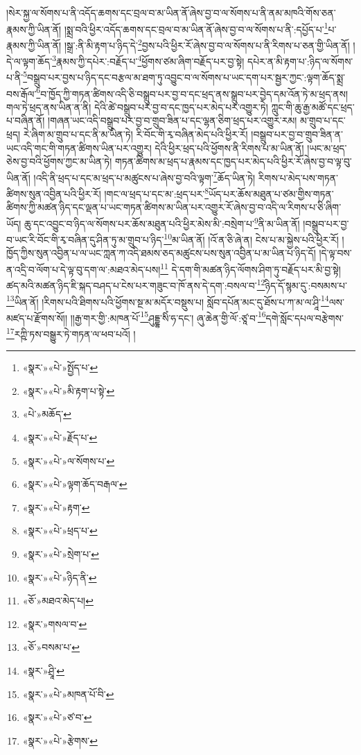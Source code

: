 །སེར་སྐྱ་ལ་སོགས་པ་ནི་འདོད་ཆགས་དང་བྲལ་བ་མ་ཡིན་ནོ་ཞེས་བྱ་བ་ལ་སོགས་པ་ནི་ནམ་མཁའི་གོས་ཅན་རྣམས་ཀྱི་ཡིན་ནོ། །སྨྲ་བའི་ཕྱིར་འདོད་ཆགས་དང་བྲལ་བ་མ་ཡིན་ནོ་ཞེས་བྱ་བ་ལ་སོགས་པ་ནི་:དཔྱོད་པ་\footnote{«སྣར་»«པེ་»སྤྱོད་པ་}པ་རྣམས་ཀྱི་ཡིན་ནོ། །སྒྲ་:ནི་མི་རྟག་པ་ཉིད་དེ་\footnote{«སྣར་»«པེ་»མི་རྟག་པ་སྟེ་}བྱས་པའི་ཕྱིར་རོ་ཞེས་བྱ་བ་ལ་སོགས་པ་ནི་རིགས་པ་ཅན་གྱི་ཡིན་ནོ། །དེ་ལ་ལྟག་ཆོད་\footnote{«པེ་»མཆོད་}རྣམས་ཀྱི་དཔེར་:བརྗོད་པ་\footnote{«སྣར་»«པེ་»རྗོད་པ་}ཕྱོགས་ཙམ་ཞིག་བརྗོད་པར་བྱ་སྟེ། དཔེར་ན་མི་རྟག་པ་:ཉིད་ལ་སོགས་པ་ནི་\footnote{«སྣར་»«པེ་»ལ་སོགས་པ་}བསྒྲུབ་པར་བྱས་པ་ཉིད་དང་བརྩལ་མ་ཐག་ཏུ་འབྱུང་བ་ལ་སོགས་པ་ཡང་དག་པར་སྦྱར་ཀྱང་:ལྟག་ཆོད་སྨྲ་བས་རྒོལ་\footnote{«སྣར་»«པེ་»ལྟག་ཆོད་བརྒལ་}བ་ཁྱོད་ཀྱི་གཏན་ཚིགས་འདི་ཅི་བསྒྲུབ་པར་བྱ་བ་དང་ཕྲད་ནས་སྒྲུབ་པར་བྱེད་དམ་འོན་ཏེ་མ་ཕྲད་ནས། གལ་ཏེ་ཕྲད་ནས་ཡིན་ན་ནི། དེའི་ཚེ་བསྒྲུབ་པར་བྱ་བ་དང་ཁྱད་པར་མེད་པར་འགྱུར་ཏེ། ཀླུང་གི་ཆུ་རྒྱ་མཚོ་དང་ཕྲད་པ་བཞིན་ནོ། །གཞན་ཡང་འདི་བསྒྲུབ་པར་བྱ་བ་གྲུབ་ཟིན་པ་དང་ལྷན་ཅིག་ཕྲད་པར་འགྱུར་རམ། མ་གྲུབ་པ་དང་ཕྲད། རེ་ཞིག་མ་གྲུབ་པ་དང་ནི་མ་ཡིན་ཏེ། རི་བོང་གི་རྭ་བཞིན་མེད་པའི་ཕྱིར་རོ། །བསྒྲུབ་པར་བྱ་བ་གྲུབ་ཟིན་ན་ཡང་འདི་གང་གི་གཏན་ཚིགས་ཡིན་པར་འགྱུར། དེའི་ཕྱིར་ཕྲད་པའི་ཕྱོགས་ནི་རིགས་པ་མ་ཡིན་ནོ། །ཡང་མ་ཕྲད་ཅེས་བྱ་བའི་ཕྱོགས་ཀྱང་མ་ཡིན་ཏེ། གཏན་ཚིགས་མ་ཕྲད་པ་རྣམས་དང་ཁྱད་པར་མེད་པའི་ཕྱིར་རོ་ཞེས་བྱ་བ་ལྟ་བུ་ཡིན་ནོ། །འདི་ནི་ཕྲད་པ་དང་མ་ཕྲད་པ་མཚུངས་པ་ཞེས་བྱ་བའི་ལྟག་\footnote{«སྣར་»«པེ་»རྟག་}ཆོད་ཡིན་ཏེ། རིགས་པ་མེད་པས་གཏན་ཚིགས་སུན་འབྱིན་པའི་ཕྱིར་རོ། །གང་ལ་ཕྲད་པ་དང་མ་:ཕྲད་པར་\footnote{«སྣར་»«པེ་»ཕྲད་པ་}ཡོད་པར་ཆོས་མཐུན་པ་ཙམ་གྱིས་གཏན་ཚིགས་ཀྱི་མཚན་ཉིད་དང་ལྡན་པ་ཡང་གཏན་ཚིགས་མ་ཡིན་པར་འགྱུར་རོ་ཞེས་བྱ་བ་འདི་ལ་རིགས་པ་ཅི་ཞིག་ཡོད། ཆུ་དང་འབྱུང་བ་ཉིད་ལ་སོགས་པར་ཆོས་མཐུན་པའི་ཕྱིར་མེས་མི་:བསྲེག་པ་\footnote{«སྣར་»«པེ་»སྲེག་པ་}ནི་མ་ཡིན་ནོ། །བསྒྲུབ་པར་བྱ་བ་ཡང་རི་བོང་གི་རྭ་བཞིན་དུ་ཤིན་ཏུ་མ་གྲུབ་པ་ཉིད་\footnote{«སྣར་»«པེ་»ཉིད་ནི་}མ་ཡིན་ནོ། །འོ་ན་ཅི་ཞེ་ན། ངེས་པ་མ་སྐྱེས་པའི་ཕྱིར་རོ། །ཁྱོད་ཀྱིས་སུན་འབྱིན་པ་ལ་ཡང་ཀླན་ཀ་འདི་ཐམས་ཅད་མཚུངས་པས་སུན་འབྱིན་པ་མ་ཡིན་པ་ཉིད་དོ། །དེ་ལྟ་བས་ན་འདྲི་བ་ལོག་པ་དེ་ལྟ་བུ་དག་ལ་:མཐའ་མེད་པས།\footnote{«ཅོ་»མཐའ་མེད་པ།} དེ་དག་གི་མཚན་ཉིད་ལོགས་ཤིག་ཏུ་བརྗོད་པར་མི་བྱ་སྟེ། ཚད་མའི་མཚན་ཉིད་ཇི་སྐད་བཤད་པ་ངེས་པར་གཟུང་བ་ཁོ་ནས་དེ་དག་:བསལ་བ་\footnote{«སྣར་»གསལ་བ་}ཉིད་དོ་སྙམ་དུ་:བསམས་པ་\footnote{«ཅོ་»བསམ་པ་}ཡིན་ནོ། །རིགས་པའི་ཐིགས་པའི་ཕྱོགས་སྔ་མ་མདོར་བསྡུས་པ། སློབ་དཔོན་མང་དུ་ཐོས་པ་ཀ་མ་ལ་ཤཱི་\footnote{«སྣར་»ཤྲཱི་}ལས་མཛད་པ་རྫོགས་སོ།། །།རྒྱ་གར་གྱི་:མཁན་པོ་\footnote{«སྣར་»«པེ་»མཁན་པོ་བི་}ཤུདྡྷ་སིཾ་ཧ་དང་། ཞུ་ཆེན་གྱི་ལོ་:ཙཱ་བ་\footnote{«སྣར་»«པེ་»ཙ་བ་}དགེ་སློང་དཔལ་བརྩེགས་\footnote{«སྣར་»«པེ་»རྩེགས་}རཀྵི་ཏས་བསྒྱུར་ཏེ་གཏན་ལ་ཕབ་པའོ། ། 